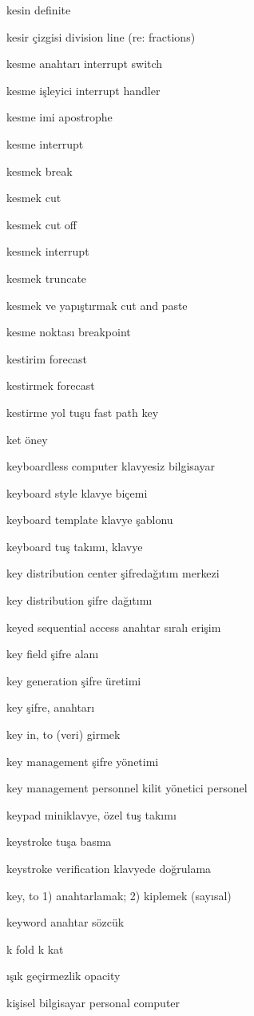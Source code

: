 \documentclass[12pt,fleqn]{article}\usepackage{../../common}
\begin{document}
kesin definite

kesir çizgisi division line (re: fractions)

kesme anahtarı interrupt switch

kesme işleyici interrupt handler

kesme imi apostrophe

kesme interrupt

kesmek break

kesmek cut

kesmek cut off

kesmek interrupt

kesmek truncate

kesmek ve yapıştırmak cut and paste

kesme noktası breakpoint

kestirim forecast

kestirmek forecast

kestirme yol tuşu fast path key

ket öney

keyboardless computer klavyesiz bilgisayar

keyboard style klavye biçemi

keyboard template klavye şablonu

keyboard tuş takımı, klavye

key distribution center şifredağıtım merkezi

key distribution şifre dağıtımı

keyed sequential access anahtar sıralı erişim

key field şifre alanı

key generation şifre üretimi

key şifre, anahtarı

key in, to (veri) girmek

key management şifre yönetimi

key management personnel kilit yönetici personel

keypad miniklavye, özel tuş takımı

keystroke tuşa basma

keystroke verification klavyede doğrulama

key, to 1) anahtarlamak; 2) kiplemek (sayısal)

keyword anahtar sözcük

k fold k kat

ışık geçirmezlik opacity

kişisel bilgisayar personal computer
\end{document}
